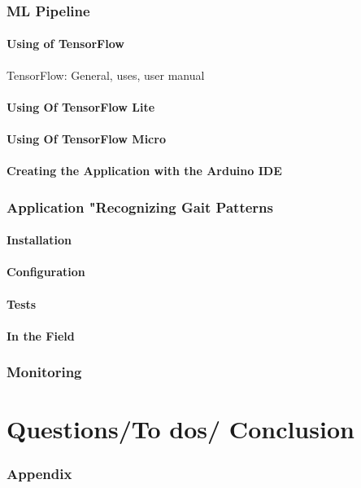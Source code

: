 \subsection{ML Pipeline}
\subsubsection{Using of TensorFlow}
TensorFlow: General, uses, user manual  

\subsubsection{Using Of TensorFlow Lite}
\subsubsection{Using Of TensorFlow Micro}
\subsubsection{Creating the Application with the Arduino IDE}


\subsection{Application "Recognizing Gait Patterns}
\subsubsection{Installation}
\subsubsection{Configuration}
\subsubsection{Tests}
\subsubsection{In the Field}
\subsection{Monitoring}
\chapter{Questions/To dos/ Conclusion}
\subsection{Appendix}
